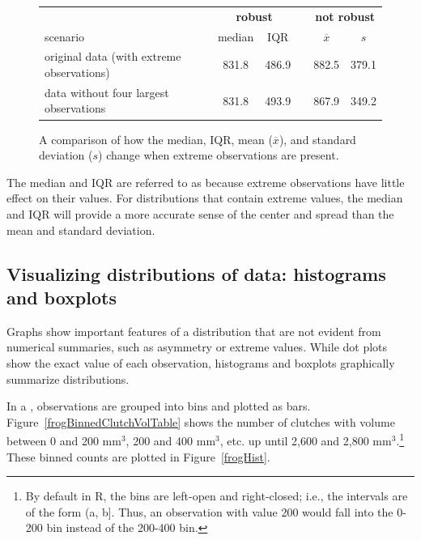 \begin{figure}[ht]
	\centering
	\begin{tabular}{l c cc c cc}
		\hline
		& \hspace{0mm} & \multicolumn{2}{c}{\bf robust} & \hspace{2mm} & \multicolumn{2}{c}{\bf not robust} \\
		scenario && median & IQR && $\overline{x}$ & $s$ \\ 
		\hline
		original data (with extreme observations) 	&& 831.8 & 486.9 && 882.5 & 379.1 \\
		data without four largest observations && 831.8 & 493.9 && 867.9 & 349.2 \\
		\hline
	\end{tabular}
	\caption{A comparison of how the median, IQR, mean ($\overline{x}$), and standard deviation ($s$) change when extreme observations are present.}
	\label{frogRobustOrNotTable}
\end{figure}

The median and IQR are referred to as  because extreme observations have little effect on their values. For distributions that contain extreme values, the median and IQR will provide a more accurate sense of the center and spread than the mean and standard deviation. 


\textD{\newpage}


\subsection{Visualizing distributions of data: histograms and boxplots}
\label{histogramsBoxplots}

Graphs show important features of a distribution that are not evident from numerical summaries, such as asymmetry or extreme values. While dot plots show the exact value of each observation, histograms and boxplots graphically summarize distributions.

In a , observations are grouped into bins and plotted as bars. Figure~\ref{frogBinnedClutchVolTable} shows the number of clutches with volume between 0 and 200 $\textrm{mm}^{3}$, 200 and 400 $\textrm{mm}^{3}$, etc. up until 2,600 and 2,800 $\textrm{mm}^{3}$.\footnote{By default in \textsf{R}, the bins are left-open and right-closed; i.e., the intervals are of the form (a, b]. Thus, an observation with value 200 would fall into the 0-200 bin instead of the 200-400 bin.} These binned counts are plotted in Figure~\ref{frogHist}.

